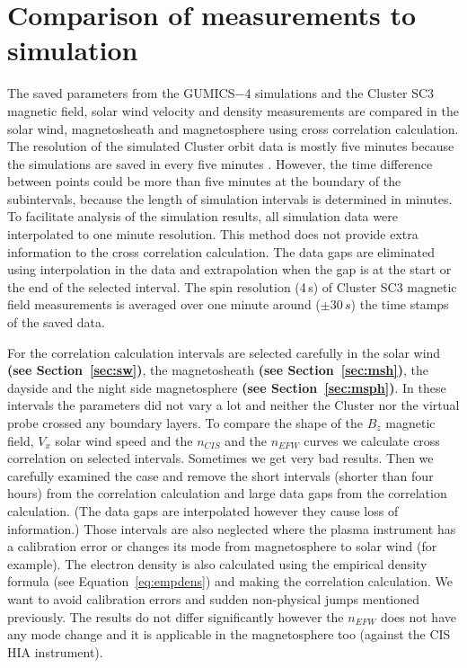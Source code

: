 \documentclass[linenumbers,draft]{agujournal}
\begin{document}
\section{Comparison of measurements to simulation}
\label{sec:comp}

The saved parameters from the GUMICS$-$4 simulations and the Cluster SC3 magnetic field, solar wind velocity and density measurements are compared in the solar wind, magnetosheath and magnetosphere using cross correlation calculation. The resolution of the simulated Cluster orbit data is mostly five minutes because the simulations are saved in every five minutes \citep{facsko16:_one_earth}. However, the time difference between points could be more than five minutes at the boundary of the subintervals, because the length of simulation intervals is determined in minutes. To facilitate analysis of the simulation results, all simulation data were interpolated to one minute resolution. This method does not provide extra information to the cross correlation calculation. The data gaps are eliminated using interpolation in the data and extrapolation when the gap is at the start or the end of the selected interval. The spin resolution (4\,s) of Cluster SC3 magnetic field measurements is averaged over one minute around ($\pm30\,s$) the time stamps of the saved data. 

For the correlation calculation intervals are selected carefully in the solar wind \textbf{(see Section~\ref{sec:sw})}, the magnetosheath \textbf{(see Section~\ref{sec:msh})}, the dayside and the night side magnetosphere \textbf{(see Section~\ref{sec:msph})}. In these intervals the parameters did not vary a lot and neither the Cluster nor the virtual probe crossed any boundary layers. To compare the shape of the $B_z$ magnetic field, $V_x$ solar wind speed and the $n_{CIS}$ and the $n_{EFW}$ curves we calculate cross correlation on selected intervals. Sometimes we get very bad results. Then we carefully examined the case and remove the short intervals (shorter than four hours) from the correlation calculation and large data gaps from the correlation calculation. (The data gaps are interpolated however they cause loss of information.) Those intervals are also neglected where the plasma instrument has a calibration error or changes its mode from magnetosphere to solar wind (for example). The electron density is also calculated using the empirical density formula (see Equation~\ref{eq:empdens}) and making the correlation calculation. We want to avoid calibration errors and sudden non-physical jumps mentioned previously. The results do not differ significantly however the $n_{EFW}$ does not have any mode change and it is applicable in the magnetosphere too (against the CIS HIA instrument).
\end{document}
